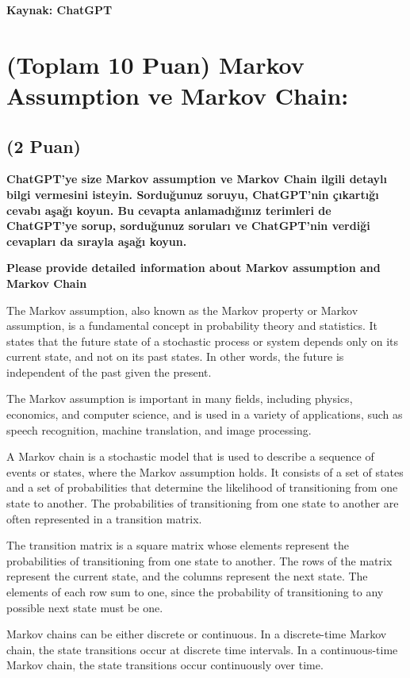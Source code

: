 \documentclass[11pt]{article}
\begin{document}
\textbf{Kaynak: ChatGPT}

\section{(Toplam 10 Puan) Markov Assumption ve Markov Chain:}

\subsection{(2 Puan)} \textbf{ChatGPT’ye size Markov assumption ve Markov Chain ilgili detaylı bilgi vermesini isteyin. Sorduğunuz soruyu, ChatGPT'nin çıkartığı cevabı aşağı koyun. Bu cevapta anlamadığınız terimleri de ChatGPT’ye sorup, sorduğunuz soruları ve ChatGPT’nin verdiği cevapları da sırayla aşağı koyun.}

\textbf{Please provide detailed information about Markov assumption and Markov Chain}

The Markov assumption, also known as the Markov property or Markov assumption, is a fundamental concept in probability theory and statistics. It states that the future state of a stochastic process or system depends only on its current state, and not on its past states. In other words, the future is independent of the past given the present.

The Markov assumption is important in many fields, including physics, economics, and computer science, and is used in a variety of applications, such as speech recognition, machine translation, and image processing.

A Markov chain is a stochastic model that is used to describe a sequence of events or states, where the Markov assumption holds. It consists of a set of states and a set of probabilities that determine the likelihood of transitioning from one state to another. The probabilities of transitioning from one state to another are often represented in a transition matrix.

The transition matrix is a square matrix whose elements represent the probabilities of transitioning from one state to another. The rows of the matrix represent the current state, and the columns represent the next state. The elements of each row sum to one, since the probability of transitioning to any possible next state must be one.

Markov chains can be either discrete or continuous. In a discrete-time Markov chain, the state transitions occur at discrete time intervals. In a continuous-time Markov chain, the state transitions occur continuously over time.
\end{document}
